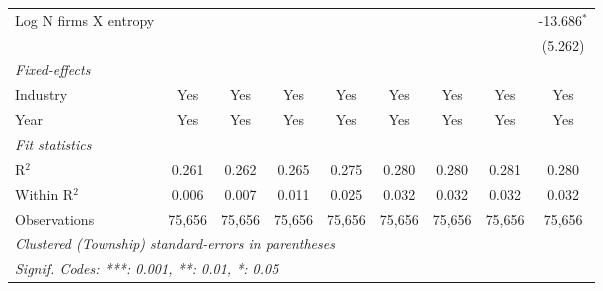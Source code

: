 \begin{tabular}{lcccccccc}
   Log N firms X entropy                                 &                  &                 &                  &                  &                  &                  &                  & -13.686$^{*}$\\   
                                                         &                  &                 &                  &                  &                  &                  &                  & (5.262)\\   
   \midrule
   \emph{Fixed-effects}\\
   Industry                                              & Yes              & Yes             & Yes              & Yes              & Yes              & Yes              & Yes              & Yes\\  
   Year                                                  & Yes              & Yes             & Yes              & Yes              & Yes              & Yes              & Yes              & Yes\\  
   \midrule
   \emph{Fit statistics}\\
   R$^2$                                                 & 0.261            & 0.262           & 0.265            & 0.275            & 0.280            & 0.280            & 0.281            & 0.280\\  
   Within R$^2$                                          & 0.006            & 0.007           & 0.011            & 0.025            & 0.032            & 0.032            & 0.032            & 0.032\\  
   Observations                                          & 75,656           & 75,656          & 75,656           & 75,656           & 75,656           & 75,656           & 75,656           & 75,656\\  
   \midrule \midrule
   \multicolumn{9}{l}{\emph{Clustered (Township) standard-errors in parentheses}}\\
   \multicolumn{9}{l}{\emph{Signif. Codes: ***: 0.001, **: 0.01, *: 0.05}}\\
\end{tabular}
\par\endgroup
